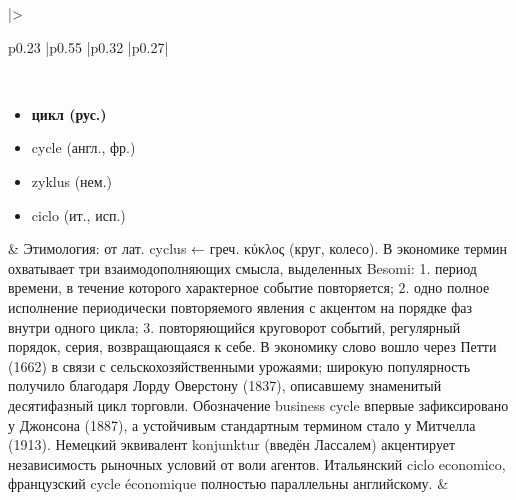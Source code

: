 \begin{longtable}{
    |>{\raggedright\arraybackslash}p{0.23\textwidth}
    |p{0.55\textwidth}
    |p{0.32\textwidth}
    |p{0.27\textwidth}|
    } %
\caption{Термины цикла}
\label{tab:cycle-terms} \\


\begin{minipage}[t]{\linewidth}
    \raggedright
    \begin{itemize}
        \item \textbf{цикл (рус.)}
        \item cycle (англ., фр.)
        \item zyklus (нем.)
        \item ciclo (ит., исп.)
    \end{itemize}
\end{minipage}
&
Этимология: от лат. cyclus ← греч. \textgreek{κύκλος} (круг, колесо). В экономике термин охватывает три взаимодополняющих смысла, выделенных Besomi: 1. \textquotedbl{}период времени, в течение которого характерное событие повторяется\textquotedbl{}; 2. \textquotedbl{}одно полное исполнение периодически повторяемого явления\textquotedbl{} с акцентом на порядке фаз внутри одного цикла; 3. \textquotedbl{}повторяющийся круговорот событий, регулярный порядок, серия, возвращающаяся к себе\textquotedbl{}. В экономику слово вошло через Петти (1662) в связи с сельскохозяйственными урожаями; широкую популярность получило благодаря Лорду Оверстону (1837), описавшему знаменитый десятифазный цикл торговли. Обозначение \textquotedbl{}business cycle\textquotedbl{} впервые зафиксировано у Джонсона (1887), а устойчивым стандартным термином стало у Митчелла (1913). Немецкий эквивалент konjunktur (введён Лассалем) акцентирует независимость рыночных условий от воли агентов. Итальянский ciclo economico, французский cycle économique полностью параллельны английскому.
&
\begin{minipage}[t]{\linewidth}
    \vspace{-7pt}
    \RaggedRight
    \begin{enumerate}

\end{enumerate}
\end{minipage}
\end{longtable}

